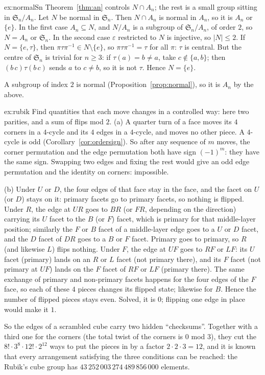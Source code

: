 \begin{solution}{ex:normalSn}
\idea Theorem~\ref{thm:an} controls $N\cap A_n$; the rest is a small group sitting in $\mathfrak S_n/A_n$.
\writeup Let $N$ be normal in $\mathfrak S_n$. Then $N\cap A_n$ is normal in $A_n$, so it is $A_n$ or $\{e\}$. In the first case $A_n\subseteq N$, and $N/A_n$ is a subgroup of $\mathfrak S_n/A_n$, of order $2$, so $N=A_n$ or $\mathfrak S_n$. In the second case $\varepsilon$ restricted to $N$ is injective, so $|N|\le2$. If $N=\{e,\tau\}$, then $\pi\tau\pi^{-1}\in N\setminus\{e\}$, so $\pi\tau\pi^{-1}=\tau$ for all $\pi$: $\tau$ is central. But the centre of $\mathfrak S_n$ is trivial for $n\ge3$: if $\tau(a)=b\ne a$, take $c\notin\{a,b\}$; then $(b\,c)\tau(b\,c)$ sends $a$ to $c\ne b$, so it is not $\tau$. Hence $N=\{e\}$.

A subgroup of index $2$ is normal (Proposition~\ref{prop:normal}), so it is $A_n$ by the above.
\end{solution}

\begin{solution}{ex:rubik}
\idea Find quantities that each move changes in a controlled way: here two parities, and a sum of flips mod $2$.
\writeup (a) A quarter turn of a face moves its $4$ corners in a $4$-cycle and its $4$ edges in a $4$-cycle, and moves no other piece. A $4$-cycle is odd (Corollary~\ref{cor:ordersign}). So after any sequence of $m$ moves, the corner permutation and the edge permutation both have sign $(-1)^m$: they have the same sign. Swapping two edges and fixing the rest would give an odd edge permutation and the identity on corners: impossible.

(b) Under $U$ or $D$, the four edges of that face stay in the face, and the facet on $U$ (or $D$) stays on it: primary facets go to primary facets, so nothing is flipped. Under $R$, the edge at $UR$ goes to $BR$ (or $FR$, depending on the direction) carrying its $U$ facet to the $B$ (or $F$) facet, which is primary for that middle-layer position; similarly the $F$ or $B$ facet of a middle-layer edge goes to a $U$ or $D$ facet, and the $D$ facet of $DR$ goes to a $B$ or $F$ facet. Primary goes to primary, so $R$ (and likewise $L$) flips nothing. Under $F$, the edge at $UF$ goes to $RF$ or $LF$: its $U$ facet (primary) lands on an $R$ or $L$ facet (not primary there), and its $F$ facet (not primary at $UF$) lands on the $F$ facet of $RF$ or $LF$ (primary there). The same exchange of primary and non-primary facets happens for the four edges of the $F$ face, so each of these $4$ pieces changes its flipped state; likewise for $B$. Hence the number of flipped pieces stays even. Solved, it is $0$; flipping one edge in place would make it $1$.

So the edges of a scrambled cube carry two hidden ``checksums''. Together with a third one for the corners (the total twist of the corners is $0$ mod $3$), they cut the $8!\cdot3^8\cdot12!\cdot2^{12}$ ways to put the pieces in by a factor $2\cdot2\cdot3=12$, and it is known that every arrangement satisfying the three conditions can be reached: the Rubik's cube group has $43\,252\,003\,274\,489\,856\,000$ elements.
\end{solution}

